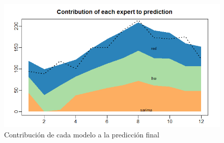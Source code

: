 \documentclass[12pt,a4paper,oneside]{article}
\begin{document}
\vspace*{3\baselineskip}
\vspace*{3\baselineskip}
\vspace*{3\baselineskip}
\begin{figure} [h]
    \centering
    \centerline{\includegraphics[scale = 0.7]{Images/6.png}}
    \caption{Contribución de cada modelo a la predicción final}
    \label{red}
\end{figure}
\vspace*{3\baselineskip}
\end{document}
